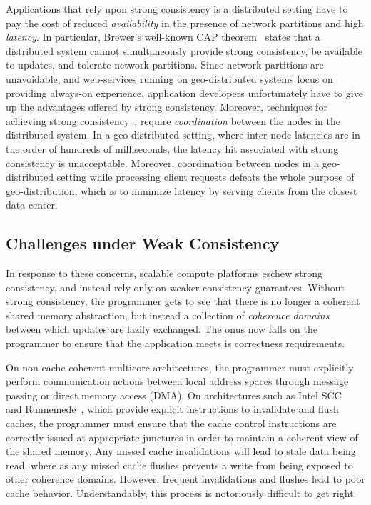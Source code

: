 Applications that rely upon strong consistency is a distributed setting have to
pay the cost of reduced \emph{availability} in the presence of network
partitions and high \emph{latency}. In particular, Brewer's well-known CAP
theorem~\cite{Brewer2000,Brewer2012,Gilbert2002} states that a distributed
system cannot simultaneously provide strong consistency, be available to
updates, and tolerate network partitions. Since network partitions are
unavoidable, and web-services running on geo-distributed systems focus on
providing always-on experience, application developers unfortunately have to
give up the advantages offered by strong consistency. Moreover, techniques for
achieving strong consistency~\cite{Burrows2006, Traiger1982, Lamport98,
Defago2004}, require \emph{coordination} between the nodes in the distributed
system. In a geo-distributed setting, where inter-node latencies are in the
order of hundreds of milliseconds, the latency hit associated with strong
consistency is unacceptable. Moreover, coordination between nodes in a
geo-distributed setting while processing client requests defeats the whole
purpose of geo-distribution, which is to minimize latency by serving clients
from the closest data center.

\subsection{Challenges under Weak Consistency}

In response to these concerns, scalable compute platforms eschew strong
consistency, and instead rely only on weaker consistency guarantees. Without
strong consistency, the programmer gets to see that there is no longer a
coherent shared memory abstraction, but instead a collection of \emph{coherence
domains} between which updates are lazily exchanged. The onus now falls on the
programmer to ensure that the application meets is correctness requirements.

On non cache coherent multicore architectures, the programmer must explicitly
perform communication actions between local address spaces through message
passing or direct memory access (DMA). On architectures such as Intel
SCC~\cite{Mattson2010} and Runnemede~\cite{Carter2013}, which provide explicit
instructions to invalidate and flush caches, the programmer must ensure that
the cache control instructions are correctly issued at appropriate junctures in
order to maintain a coherent view of the shared memory. Any missed cache
invalidations will lead to stale data being read, where as any missed cache
flushes prevents a write from being exposed to other coherence domains.
However, frequent invalidations and flushes lead to poor cache behavior.
Understandably, this process is notoriously difficult to get right.

